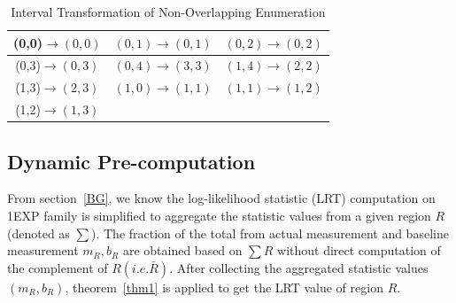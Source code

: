 \documentclass[AMA,LATO1COL]{WileyNJD-v2}
\begin{document}
\begin{table}[!ht]
  \centering
  \caption{Example: PU assignment  }\label{exampletable}

\end{table}

\begin{table}[t]
\centering \caption{Interval Transformation of Non-Overlapping Enumeration\label{tab:op}}
     \begin{tabular}{|c|c|c|}
	\hline
    (0,0)$\rightarrow (0,0)$  &  $(0,1) \rightarrow (0,1)$&  $(0,2) \rightarrow (0,2)$ \\
    \hline
    (0,3)$\rightarrow (0,3)$  &  $(0,4) \rightarrow (3,3)$&  $(1,4) \rightarrow (2,2)$ \\
    \hline
    (1,3)$\rightarrow (2,3)$  &  $(1,0) \rightarrow (1,1)$&  $(1,1) \rightarrow (1,2)$ \\
    \hline
     (1,2)$\rightarrow (1,3)$  &    &  \\
    \hline
\end{tabular}
\label{ex-nonoverlap}
\end{table}

\subsection{Dynamic Pre-computation}
\label{sec:mov2}
From section~\ref{BG}, we know the log-likelihood statistic (LRT) computation on 1EXP family is simplified to aggregate the statistic values from a given region $R$ (denoted as $\sum $). The fraction of the total from actual measurement and baseline measurement $m_R,b_R$ are obtained based on $\sum R$ without direct computation of the complement of $R (i.e. \bar R)$. After collecting the aggregated statistic values $(m_R,b_R)$, theorem~\ref{thm1} is applied to get the LRT value of region $R$.
\end{document}
